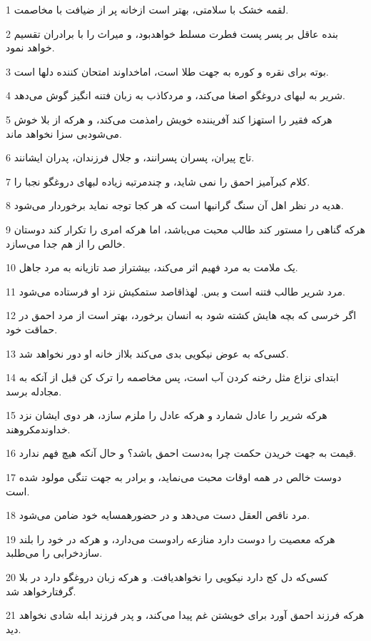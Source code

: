 \par 1 لقمه خشک با سلامتی، بهتر است ازخانه پر از ضیافت با مخاصمت.
\par 2 بنده عاقل بر پسر پست فطرت مسلط خواهدبود، و میراث را با برادران تقسیم خواهد نمود.
\par 3 بوته برای نقره و کوره به جهت طلا است، اماخداوند امتحان کننده دلها است.
\par 4 شریر به لبهای دروغگو اصغا می‌کند، و مردکاذب به زبان فتنه انگیز گوش می‌دهد.
\par 5 هر‌که فقیر را استهزا کند آفریننده خویش رامذمت می‌کند، و هر‌که از بلا خوش می‌شودبی سزا نخواهد ماند.
\par 6 تاج پیران، پسران پسرانند، و جلال فرزندان، پدران ایشانند.
\par 7 کلام کبرآمیز احمق را نمی شاید، و چندمرتبه زیاده لبهای دروغگو نجبا را.
\par 8 هدیه در نظر اهل آن سنگ گرانبها است که هر کجا توجه نماید برخوردار می‌شود.
\par 9 هر‌که گناهی را مستور کند طالب محبت می‌باشد، اما هر‌که امری را تکرار کند دوستان خالص را از هم جدا می‌سازد.
\par 10 یک ملامت به مرد فهیم اثر می‌کند، بیشتراز صد تازیانه به مرد جاهل.
\par 11 مرد شریر طالب فتنه است و بس. لهذاقاصد ستمکیش نزد او فرستاده می‌شود.
\par 12 اگر خرسی که بچه هایش کشته شود به انسان برخورد، بهتر است از مرد احمق در حماقت خود.
\par 13 کسی‌که به عوض نیکویی بدی می‌کند بلااز خانه او دور نخواهد شد.
\par 14 ابتدای نزاع مثل رخنه کردن آب است، پس مخاصمه را ترک کن قبل از آنکه به مجادله برسد.
\par 15 هر‌که شریر را عادل شمارد و هر‌که عادل را ملزم سازد، هر دوی ایشان نزد خداوندمکروهند.
\par 16 قیمت به جهت خریدن حکمت چرا به‌دست احمق باشد؟ و حال آنکه هیچ فهم ندارد.
\par 17 دوست خالص در همه اوقات محبت می‌نماید، و برادر به جهت تنگی مولود شده است.
\par 18 مرد ناقص العقل دست می‌دهد و در حضورهمسایه خود ضامن می‌شود. 
\par 19 هر‌که معصیت را دوست دارد منازعه رادوست می‌دارد، و هر‌که در خود را بلند سازدخرابی را می‌طلبد.
\par 20 کسی‌که دل کج دارد نیکویی را نخواهدیافت. و هر‌که زبان دروغگو دارد در بلا گرفتارخواهد شد.
\par 21 هر‌که فرزند احمق آورد برای خویشتن غم پیدا می‌کند، و پدر فرزند ابله شادی نخواهد دید.
